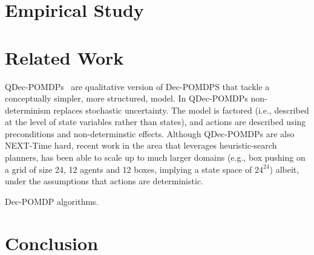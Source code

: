 \documentclass[letterpaper]{article} %
\newcommand{\eliran}[1]{\textbf{[\color{red}ELIRAN:#1]}}
\begin{document}


\section{Empirical Study}






\section{Related Work}
QDec-POMDPs~\cite{} are qualitative version of Dec-POMDPS that tackle a conceptually simpler, more structured, model. In QDec-POMDPs 
non-determinism replaces stochastic uncertainty. The model is factored (i.e., described at the level of state variables rather than states), and actions 
are described using preconditions and non-determinstic effects. Although QDec-POMDPs are also NEXT-Time hard, recent work in the area that leverages heuristic-search planners, has been able to scale up to much larger domains (e.g., box pushing on a grid of size 24,  12 agents and 12 boxes, implying a state space of $24^24$)
albeit, under the assumptions that actions are deterministic.

Dec-POMDP algorithms.

\section{Conclusion}
\end{document}
